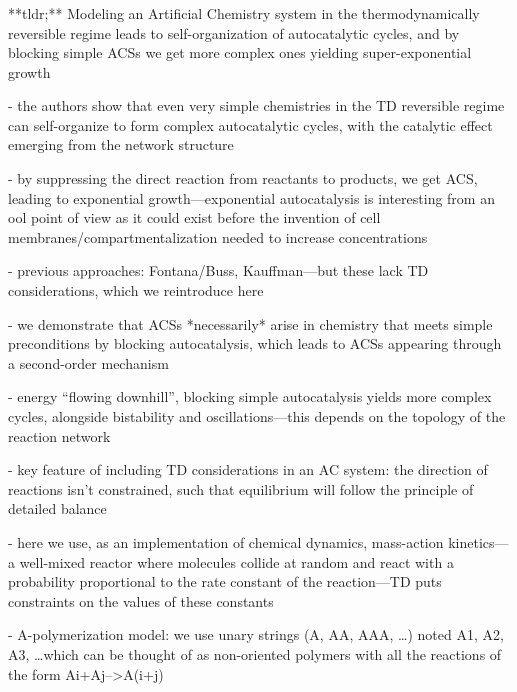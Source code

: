 \documentclass[11pt]{article}
\begin{document}
\clearpage

\subsubsection{\texorpdfstring{\cite{virgo_complex_2016}}{}}

\begin{markdown}

**tldr;** Modeling an Artificial Chemistry system in the thermodynamically reversible regime leads to self-organization of autocatalytic cycles, and by blocking simple ACSs we get more complex ones yielding super-exponential growth

- the authors show that even very simple chemistries in the TD reversible regime can self-organize to form complex autocatalytic cycles, with the catalytic effect emerging from the network structure
    
- by suppressing the direct reaction from reactants to products, we get ACS, leading to exponential growth—exponential autocatalysis is interesting from an ool point of view as it could exist before the invention of cell membranes/compartmentalization needed to increase concentrations
    
- previous approaches: Fontana/Buss, Kauffman—but these lack TD considerations, which we reintroduce here
    
- we demonstrate that ACSs *necessarily* arise in chemistry that meets simple preconditions by blocking autocatalysis, which leads to ACSs appearing through a second-order mechanism
    
- energy “flowing downhill”, blocking simple autocatalysis yields more complex cycles, alongside bistability and oscillations—this depends on the topology of the reaction network
    
- key feature of including TD considerations in an AC system: the direction of reactions isn’t constrained, such that equilibrium will follow the principle of detailed balance
    
- here we use, as an implementation of chemical dynamics, mass-action kinetics—a well-mixed reactor where molecules collide at random and react with a probability proportional to the rate constant of the reaction—TD puts constraints on the values of these constants
    
- A-polymerization model: we use unary strings (A, AA, AAA, …) noted A1, A2, A3, …which can be thought of as non-oriented polymers with all the reactions of the form Ai+Aj-->A(i+j)
    

\end{markdown}
\end{document}
